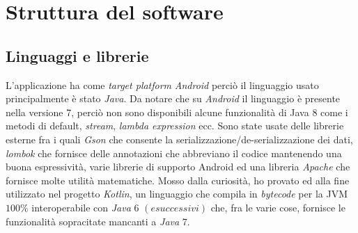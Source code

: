 \chapter{Struttura del software}

\section{Linguaggi e librerie}
L'applicazione ha come \textit{target platform} \textit{Android} perci\`o il linguaggio usato principalmente \`e stato \textit{Java}. Da notare che su \textit{Android} il linguaggio \`e presente nella versione 7, perci\`o non sono disponibili alcune funzionalit\`a di Java 8 come i metodi di default, \textit{stream}, \textit{lambda expression} ecc. Sono state usate delle librerie esterne fra i quali \textit{Gson} che consente la serializzazione/de-serializzazione dei dati, \textit{lombok} che fornisce delle annotazioni che abbreviano il codice mantenendo una buona espressivit\`a, varie librerie di supporto Android ed una libreria \textit{Apache} che fornisce molte utilit\`a matematiche. Mosso dalla curiosit\`a, ho provato ed alla fine utilizzato nel progetto \textit{Kotlin}, un linguaggio che compila in \textit{bytecode} per la JVM $100 \%$ interoperabile con \textit{Java} 6 $(e successivi)$ che, fra le varie cose, fornisce le funzionalit\`a sopracitate mancanti a \textit{Java} 7.

